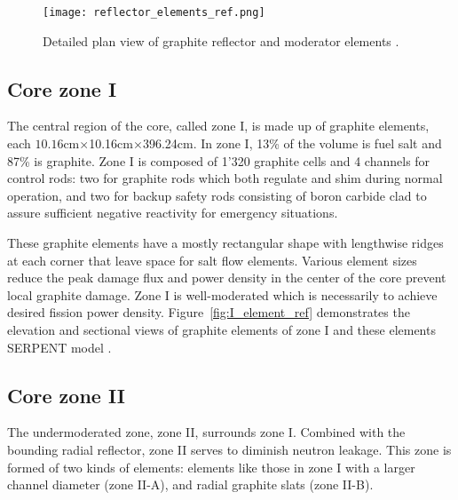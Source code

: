 \begin{figure}[hbp!] %
  \centering
  \vspace{-0.3em}
  \texttt{[image: reflector\_elements\_ref.png]}
  \caption{Detailed plan view of graphite reflector and moderator elements \cite{robertson_conceptual_1971}.}
  \vspace{-0.6em}
  \label{fig:detail_plan_view}
\end{figure}
\FloatBarrier

\subsection{Core zone I}
The central region of the core, called zone I, is made up of graphite elements, each $10.16$cm$\times$10.16cm$\times$396.24cm. In zone I, 13\% of the volume is fuel salt and 87\% is graphite. Zone I is composed of 1'320 graphite cells and 4 channels for control rods: two for graphite rods which both regulate and shim during normal operation, and two for backup safety rods consisting of boron carbide clad to assure sufficient negative reactivity for emergency situations.

These graphite elements have a mostly rectangular shape with lengthwise ridges at each corner that leave space for salt flow elements. Various element sizes reduce the peak damage flux and power density in the center of the core prevent local graphite damage. Zone I is well-moderated which is necessarily to achieve desired fission power density. Figure~\ref{fig:I_element_ref} demonstrates the elevation and sectional views of graphite elements of zone I \cite{robertson_conceptual_1971} and these elements SERPENT model \cite{rykhlevskii_full-core_2017}.

\subsection{Core zone II}
The undermoderated zone, zone II, surrounds zone I. Combined with the bounding radial reflector, zone II serves to diminish neutron leakage. This zone is formed of two kinds of elements: elements like those in zone I with a larger channel diameter (zone II-A), and radial graphite slats (zone II-B). 

